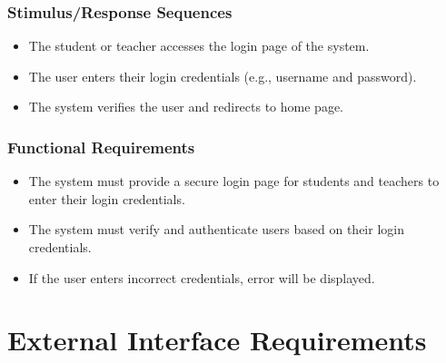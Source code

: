 \documentclass{article}
\begin{document}
\subsubsection{Stimulus/Response Sequences}
\begin{itemize}
  \item The student or teacher accesses the login page of the system.
  \item The user enters their login credentials (e.g., username and password).
  \item The system verifies the user and redirects to home page.
\end{itemize}

\subsubsection{Functional Requirements}
\begin{itemize}
\item The system must provide a secure login page for students and teachers to enter their login credentials.
\item The system must verify and authenticate users based on their login credentials.
\item If the user enters incorrect credentials, error will be displayed.
\end{itemize}


\section{External Interface Requirements}
\end{document}

